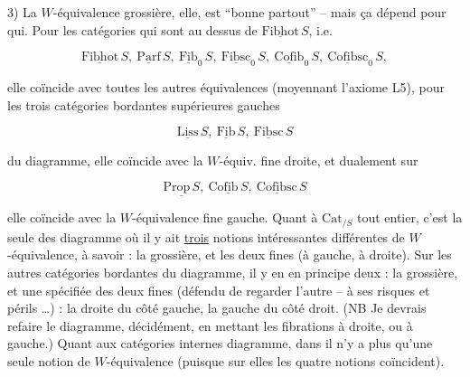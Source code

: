 3) La $W$-équivalence grossière, elle, est ``bonne partout'' -- mais ça dépend pour qui. Pour les  catégories qui sont  au dessus de $\underline{\mathrm{Fibhot}}\,S$, i.e.

\[
 \underline{\mathrm{Fibhot}}\,S,\ \underline{\mathrm{Parf}}\,S,\ \underline{\mathrm{Fib}}_0\,S,\ \underline{\mathrm{Fibsc}}_0\,S,\ \underline{\mathrm{Cofib}}_0\,S,\ \underline{\mathrm{Cofibsc}}_0\,S,
\]

elle coïncide avec toutes les autres équivalences \unsure{$\in$|$\varepsilon$} (moyennant l'axiome L5), pour les trois catégories bordantes supérieures gauches

\[
 \underline{\mathrm{Liss}}\,S,\ \underline{\mathrm{Fib}}\,S,\ \underline{\mathrm{Fibsc}}\,S
\]

du diagramme, elle coïncide avec la $W$-équiv. fine droite, et dualement sur

\[
 \underline{\mathrm{Prop}\,S},\ \underline{\mathrm{Cofib}\,S},\ \underline{\mathrm{Cofibsc}}\,S
\]

elle coïncide  avec la $W$-équivalence fine gauche. Quant à $\mathrm{Cat}_{/S}$ tout entier, c'est la seule des    diagramme où il y ait \uline{trois} notions intéressantes différentes de $W$-équivalence, à savoir : la grossière, et les deux fines (à gauche, à droite). Sur les autres  catégories bordantes du diagramme, il y en  en principe deux : la grossière, et une spécifiée des deux fines (défendu de regarder l'autre -- à ses risques et périls \ldots) : la droite du côté gauche, la gauche du côté droit. (NB Je devrais refaire le diagramme, décidément, en mettant les fibrations à droite, ou à gauche.) Quant aux  catégories internes  diagramme, dans  il n'y a plus qu'une seule notion de $W$-équivalence (puisque sur elles les quatre notions coïncident).

